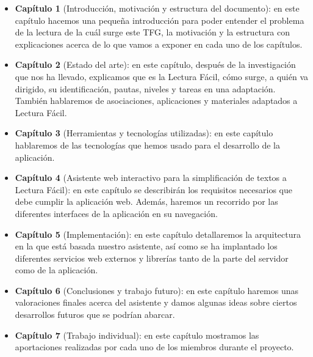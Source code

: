 \begin{itemize}
	\item {\textbf{Capítulo 1}} (Introducción, motivación y estructura del documento): en este capítulo hacemos una pequeña introducción para poder entender el problema de la lectura de la cuál surge este TFG, la motivación y la estructura con explicaciones acerca de lo que vamos a exponer en cada uno de los capítulos.
	
 \setlength{\parskip}{10pt}
	
	\item{\textbf{Capítulo 2}} (Estado del arte): en este capítulo, después de la investigación que nos ha llevado, explicamos que es la Lectura Fácil, cómo surge, a quién va dirigido, su identificación, pautas, niveles y tareas en una adaptación. También hablaremos de asociaciones, aplicaciones y materiales adaptados a Lectura Fácil. 

 \setlength{\parskip}{10pt}

\item{\textbf{Capítulo 3}} (Herramientas y tecnologías utilizadas): en este capítulo hablaremos de las tecnologías que hemos usado para el desarrollo de la aplicación.
 \setlength{\parskip}{10pt}

\item{\textbf{Capítulo 4}} (Asistente web interactivo para la simplificación de textos a Lectura Fácil): en este capítulo se describirán los requisitos necesarios que debe cumplir la aplicación web. Además, haremos un recorrido por las diferentes interfaces de la aplicación en su navegación. 

\item{\textbf{Capítulo 5}} (Implementación): en este capítulo detallaremos la arquitectura en la que está basada nuestro asistente, así como se ha implantado los diferentes servicios web externos y librerías tanto de la parte del servidor como de la aplicación. 
\item{\textbf{Capítulo 6}} (Conclusiones y trabajo futuro): en este capítulo haremos unas valoraciones finales acerca del asistente y damos algunas ideas sobre ciertos desarrollos futuros que se podrían abarcar.

\item{\textbf{Capítulo 7}} (Trabajo individual): en este capítulo mostramos las aportaciones realizadas por cada uno de los miembros durante el proyecto.



\end{itemize}


